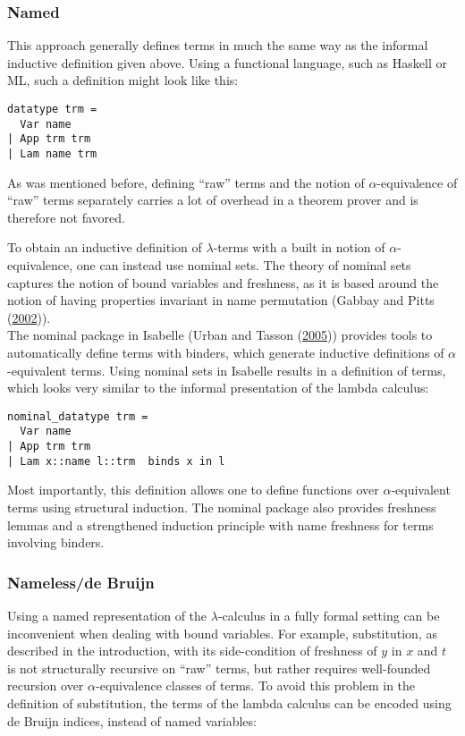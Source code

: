 \documentclass[a4paper, 12pt, twoside]{style/ociamthesis}
\theoremstyle{plain}
\theoremstyle{definition}
\theoremstyle{remark}
\begin{document}
\subsubsection{Named}\label{named}

This approach generally defines terms in much the same way as the
informal inductive definition given above. Using a functional language,
such as Haskell or ML, such a definition might look like this:

\begin{verbatim}
datatype trm =
  Var name
| App trm trm
| Lam name trm
\end{verbatim}

As was mentioned before, defining ``raw'' terms and the notion of
\(\alpha\)-equivalence of ``raw'' terms separately carries a lot of
overhead in a theorem prover and is therefore not favored.

To obtain an inductive definition of \(\lambda\)-terms with a built in
notion of \(\alpha\)-equivalence, one can instead use nominal sets. The
theory of nominal sets captures the notion of bound variables and
freshness, as it is based around the notion of having properties
invariant in name permutation (Gabbay and Pitts
(\protect\hyperlink{ref-gabbay02}{2002})).\\
The nominal package in Isabelle (Urban and Tasson
(\protect\hyperlink{ref-urban05}{2005})) provides tools to automatically
define terms with binders, which generate inductive definitions of
\(\alpha\)-equivalent terms. Using nominal sets in Isabelle results in a
definition of terms, which looks very similar to the informal
presentation of the lambda calculus:

\begin{verbatim}
nominal_datatype trm =
  Var name
| App trm trm
| Lam x::name l::trm  binds x in l
\end{verbatim}

Most importantly, this definition allows one to define functions over
\(\alpha\)-equivalent terms using structural induction. The nominal
package also provides freshness lemmas and a strengthened induction
principle with name freshness for terms involving binders.

\subsubsection{Nameless/de Bruijn}\label{namelessde-bruijn}

Using a named representation of the \(\lambda\)-calculus in a fully
formal setting can be inconvenient when dealing with bound variables.
For example, substitution, as described in the introduction, with its
side-condition of freshness of \(y\) in \(x\) and \(t\) is not
structurally recursive on ``raw'' terms, but rather requires
well-founded recursion over \(\alpha\)-equivalence classes of terms. To
avoid this problem in the definition of substitution, the terms of the
lambda calculus can be encoded using de Bruijn indices, instead of named
variables:
\end{document}

